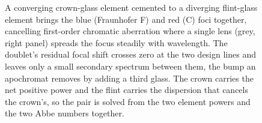 \begin{figure}[htbp]
\caption[The achromatic doublet]{A converging crown-glass element cemented to a
diverging flint-glass element brings the blue (Fraunhofer F) and red (C) foci
together, cancelling first-order chromatic aberration where a single lens (grey,
right panel) spreads the focus steadily with wavelength. The doublet's residual
focal shift crosses zero at the two design lines and leaves only a small
secondary spectrum between them, the bump an apochromat removes by adding a third
glass. The crown carries the net positive power and the flint carries the
dispersion that cancels the crown's, so the pair is solved from the two element
powers and the two Abbe numbers together.}
\label{fig:vol04ch11:achromat-doublet}
\end{figure}
